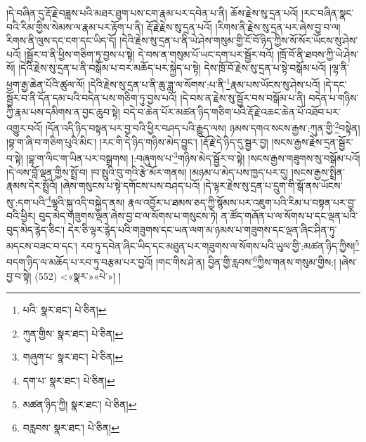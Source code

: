 །དེ་བཞིན་དུ་རྡོ་རྗེ་བཟླས་པའི་མཐར་ཐུག་པས་ངག་རྣམ་པར་དབེན་པ་ནི། ཆོས་རྗེས་སུ་དྲན་པའོ། །རང་བཞིན་སྣང་བའི་རིམ་གྱིས་སེམས་ལ་རྣམ་པར་རྟོག་པ་ནི། རྡོ་རྗེ་རྗེས་སུ་དྲན་པའོ། །རིགས་ནི་རྗེས་སུ་དྲན་པར་ཞེས་བྱ་བ་ལ། རིགས་ནི་ལུས་དང་ངག་དང་ཡིད་དོ། །དེའི་རྗེས་སུ་དྲན་པ་ནི་ཡེ་ཤེས་གསུམ་གྱི་ངོ་བོ་ཉིད་ཀྱིས་སོ་སོར་ཡོངས་སུ་ཤེས་པའོ། །སྦྱོར་བ་ནི་ཕྱིས་གཅིག་ཏུ་བྱས་པ་སྟེ། དེ་བས་ན་གསུམ་པོ་ཡང་དག་པར་སྦྱོར་བའོ། །ཁྲོ་བོ་ནི་ཐབས་ཀྱི་ཡེ་ཤེས་སོ། །དེའི་རྗེས་སུ་དྲན་པ་ནི་བསྒོམ་པ་བར་མཆོད་པར་སྐྱེད་པ་སྟེ། དེས་ཁྲོ་བོ་རྗེས་སུ་དྲན་པ་སྟེ་བསྒོམ་པའོ། །ལྷ་ནི་ཕྱག་རྒྱ་ཆེན་པོའི་ཚུལ་ལོ། །དེའི་རྗེས་སུ་དྲན་པ་ནི་ཆུ་ཟླ་ལ་སོགས་:པ་ནི་\footnote{པའི་  སྣར་ཐང་།  པེ་ཅིན། }རྣམ་པས་ཡོངས་སུ་ཤེས་པའོ། །དེ་དང་སྦྱོར་བ་ནི་དོན་དམ་པའི་བདེན་པས་གཅིག་ཏུ་བྱས་པའོ། །དེ་བས་ན་རྗེས་སུ་སྦྱོར་བས་བསྒོམ་པ་ནི། བདེན་པ་གཉིས་ཀྱི་རྣམ་པས་དམིགས་ན་བྱང་ཆུབ་སྟེ། བདེ་བ་ཆེན་པོར་མཚན་ཉིད་གཅིག་པའི་རྡོ་རྗེ་འཆང་ཆེན་པོ་འཐོབ་པར་འགྱུར་བའོ། །དོན་འདི་ཉིད་བསྟན་པར་བྱ་བའི་ཕྱིར་བཤད་པའི་རྒྱུད་ལས། ཉམས་དགའ་སངས་རྒྱས་:ཀུན་གྱི་\footnote{ཀུན་གྱིས་  སྣར་ཐང་།  པེ་ཅིན། }བསྟེན། །བྷ་ག་ཞི་བ་གཅིག་པུའི་མིང་། །རང་གི་དེ་ཉིད་གཉིས་མེད་བྱུང་། །རྡོ་རྗེ་དེ་ཉིད་དུ་སྦྱར་བྱ། །སངས་རྒྱས་རྗེས་དྲན་སྦྱོར་བ་སྟེ། །བྷ་ག་ལིང་ག་ཡིན་པར་བསྒྲགས། །:བཞུགས་པ་\footnote{གཞུག་པ་  སྣར་ཐང་།  པེ་ཅིན། }གཉིས་མེད་སྦྱོར་བ་སྟེ། །སངས་རྒྱས་གཟུགས་སུ་བསྒོམ་པའོ། །དེ་ལས་བློ་ལྡན་གྱིས་སྤྲོ་བ། །བ་སྤུའི་བུ་གའི་རྩེ་མོར་གནས། །མཉམ་པ་མེད་པས་ཁྱད་པར་དུ། །སངས་རྒྱས་སྤྲིན་རྣམས་དེར་སྤྲོའོ། །ཞེས་གསུངས་པ་སྟེ་དགོངས་པས་བཤད་པའོ། །དེ་ལྟར་རྗེས་སུ་དྲན་པ་དྲུག་གི་སྒོ་ནས་ཡོངས་སུ་:དག་པའི་\footnote{དག་པ་  སྣར་ཐང་།  པེ་ཅིན། }ལྷའི་སྐུ་འདི་བསྐྱེད་ནས། རྣལ་འབྱོར་པ་ཐམས་ཅད་ཀྱི་སྙོམས་པར་འཇུག་པའི་རིམ་པ་བསྟན་པར་བྱ་བའི་ཕྱིར། བུད་མེད་གཟུགས་ལྡན་ཞེས་བྱ་བ་ལ་སོགས་པ་གསུངས་ཏེ། ན་ཚོད་གཞོན་པ་ལ་སོགས་པ་དང་ལྡན་པའི་བུད་མེད་རྙེད་ཅིང་། དེར་ཅི་ལྟར་རྙེད་པའི་གཟུགས་དང་ཡན་ལག་མ་ཉམས་པ་གཟུགས་དང་ལྡན་ཞིང་ཤིན་ཏུ་མདངས་བཟང་བ་དང་། རབ་ཏུ་དབེན་ཞིང་ཡིད་དང་མཐུན་པར་གཟུགས་ལ་སོགས་པའི་ཡུལ་གྱི་:མཚན་ཉིད་ཀྱིས།\footnote{མཚན་ཉིད་ཀྱི།  སྣར་ཐང་།  པེ་ཅིན། } བདག་ཉིད་ལ་མཆོད་པ་རབ་ཏུ་བརྩམ་པར་བྱའོ། །གང་གིས་ཤེ་ན། བྱིན་གྱི་རླབས་\footnote{བརླབས་  སྣར་ཐང་།  པེ་ཅིན། }ཀྱིས་གནས་གསུམ་གྱིས:། །ཞེས་བྱ་བ་སྟེ། (552) <«སྣར་»«པེ་»། །
